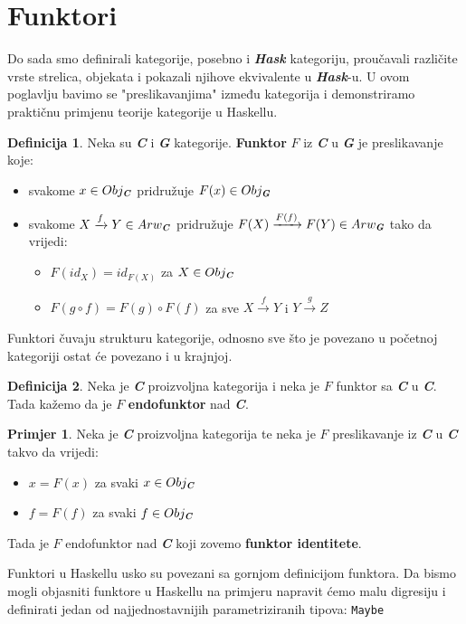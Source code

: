 \documentclass[11pt]{article}
\newcommand{\category}[1]{\textbf{\emph{#1}}}
\newcommand{\codei}[1]{
  {\lstinline[basicstyle=\ttfamily]{#1}}
}
\theoremstyle{definition}
\newtheorem{definition}{Definicija}
\newtheorem{primjer}{Primjer}
\begin{document}
  \section{Funktori}
  Do sada smo definirali kategorije, posebno i \category{Hask} kategoriju,
  proučavali različite vrste strelica, objekata i pokazali njihove ekvivalente
  u \category{Hask}-u. U ovom poglavlju bavimo se "preslikavanjima" između
  kategorija i demonstriramo praktičnu primjenu teorije kategorije u Haskellu.
  \begin{definition}
    Neka su \category{C} i \category{G} kategorije. \textbf{Funktor} $F$ iz
    \category{C} u \category{G} je preslikavanje koje:
    \begin{itemize}
      \item svakome $x \in Obj_\category{C}$ pridružuje $F(x) \in
        Obj_\category{G}$
      \item svakome $X \xrightarrow{f} Y \in Arw_\category{C}$ pridružuje
        $F(X) \xrightarrow{F(f)} F(Y) \in Arw_\category{G}$ tako da vrijedi:
        \begin{itemize}
          \item $F(id_X) = id_{F(X)}$ za $X \in Obj_\category{C}$
          \item $F(g \circ f) = F(g) \circ F(f)$ za sve $X \xrightarrow{f} Y$ i
            $Y \xrightarrow{g} Z$
        \end{itemize}
    \end{itemize}
  \end{definition}
  Funktori čuvaju strukturu kategorije, odnosno sve što je povezano u početnoj
  kategoriji ostat će povezano i u krajnjoj.
  \begin{definition}
    Neka je \category{C} proizvoljna kategorija i neka je $F$ funktor sa
    \category{C} u \category{C}. Tada kažemo da je $F$ \textbf{endofunktor} nad
    \category{C}.
  \end{definition}
  \begin{primjer}
    Neka je \category{C} proizvoljna kategorija te neka je $F$ preslikavanje
    iz \category{C}  u \category{C} takvo da vrijedi:
    \begin{itemize}
      \item $x = F(x)$ za svaki $x \in Obj_\category{C}$
      \item $f = F(f)$ za svaki $f \in Obj_\category{C}$
    \end{itemize}
    Tada je $F$ endofunktor nad \category{C} koji zovemo \textbf{funktor identitete}.
  \end{primjer}
  Funktori u Haskellu usko su povezani sa gornjom definicijom funktora. 
  Da bismo mogli objasniti funktore u Haskellu na primjeru napravit ćemo malu digresiju i definirati
  jedan od najjednostavnijih parametriziranih tipova: \codei{Maybe}
\end{document}
